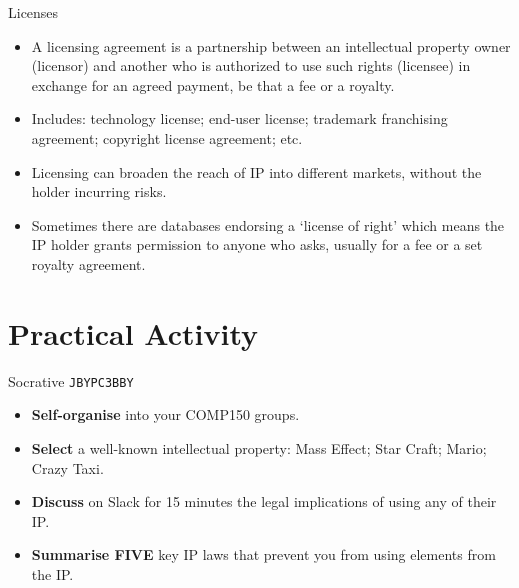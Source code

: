 \begin{frame}{Licenses}
	\begin{itemize}
		\item A licensing agreement is a partnership between an intellectual property owner (licensor) and another 
		who is authorized to use such rights (licensee) in exchange for an agreed payment, be that a fee or a royalty.
		\item Includes: technology license; end-user license; trademark franchising agreement; copyright license agreement; etc.
		\item Licensing can broaden the reach of IP into different markets, without the holder incurring risks.
		\item Sometimes there are databases endorsing a `license of right' which means the IP holder grants permission
		to anyone who asks, usually for a fee or a set royalty agreement.
	\end{itemize}
\end{frame}

\part{Practical Activity}
\frame{\partpage}

\begin{frame}[fragile]{Socrative \texttt{JBYPC3BBY}}
	\begin{itemize}
		\item \textbf{Self-organise} into your COMP150 groups.
		\item \textbf{Select} a well-known intellectual property: Mass Effect; Star Craft; Mario; Crazy Taxi.
		\item \textbf{Discuss} on Slack for 15 minutes the legal implications of using any of their IP.
		\vspace{2ex}
		\item \textbf{Summarise FIVE} key IP laws that prevent you from using elements from the IP.
	\end{itemize}
\end{frame}